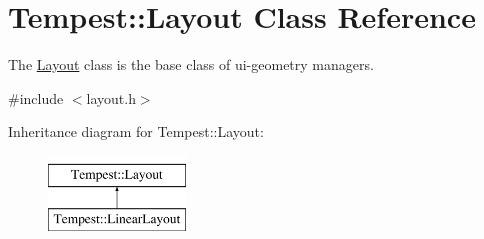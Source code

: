 \hypertarget{class_tempest_1_1_layout}{\section{Tempest\+:\+:Layout Class Reference}
\label{class_tempest_1_1_layout}
}


The \hyperlink{class_tempest_1_1_layout}{Layout} class is the base class of ui-\/geometry managers.  




{\ttfamily \#include $<$layout.\+h$>$}

Inheritance diagram for Tempest\+:\+:Layout\+:\begin{figure}[H]
\begin{center}
\leavevmode
\includegraphics[height=2.000000cm]{class_tempest_1_1_layout}
\end{center}
\end{figure}

